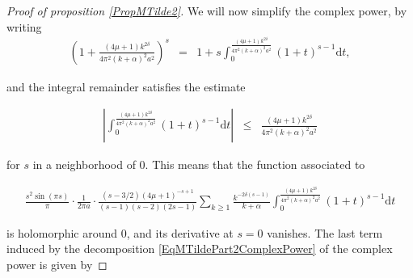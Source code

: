 \documentclass{jams-l}
\theoremstyle{definition}
\theoremstyle{remark}
\numberwithin{equation}{section}
\begin{document}
\begin{proof}[Proof of proposition \ref{PropMTilde2}]
                        \noindent We will now simplify the complex power, by writing
                        \begin{equation}
                        \label{EqMTildePart2ComplexPower}
                            \begin{array}{lll}
                                \left( 1 + \frac{\left( 4 \mu + 1 \right) k^{2 \delta}}{4 \pi^2 \left( k + \alpha \right)^2 a^2} \right)^s & = & 1 + s \int_0^{\frac{\left( 4 \mu + 1 \right) k^{2 \delta}}{4 \pi^2 \left( k + \alpha \right)^2 a^2}} \left( 1 + t \right)^{s-1} \mathrm{d}t,
                            \end{array}
                        \end{equation}
                        
                        \noindent and the integral remainder satisfies the estimate
                        
                        \[ \begin{array}{lll}
                                \left \vert \int_0^{\frac{\left( 4 \mu + 1 \right) k^{2 \delta}}{4 \pi^2 \left( k + \alpha \right)^2 a^2}} \left( 1 + t \right)^{s-1} \mathrm{d}t \right \vert & \leqslant & \frac{\left( 4 \mu + 1 \right) k^{2 \delta}}{4 \pi^2 \left( k + \alpha \right)^2 a^2}
                            \end{array} \]
                        
                        \noindent for $s$ in a neighborhood of $0$. This means that the function associated to
                        
                        \[ \begin{array}{c}
                                \frac{s^2 \sin \left( \pi s \right)}{\pi} \cdot \frac{1}{2 \pi a} \cdot \frac{\left( s-3/2 \right) \left( 4 \mu + 1 \right)^{-s+1}}{\left( s-1 \right) \left( s-2 \right) \left( 2s-1 \right)} \sum\limits_{k \geqslant 1} \frac{k^{- 2 \delta \left( s-1 \right)}}{k + \alpha} \int_0^{\frac{\left( 4 \mu + 1 \right) k^{2 \delta}}{4 \pi^2 \left( k + \alpha \right)^2 a^2}} \left( 1 + t \right)^{s-1} \mathrm{d}t
                            \end{array} \]
                        
                        \noindent is holomorphic around $0$, and its derivative at $s=0$ vanishes. The last term induced by the decomposition \eqref{EqMTildePart2ComplexPower} of the complex power is given by
                        

\end{proof}
\end{document}
